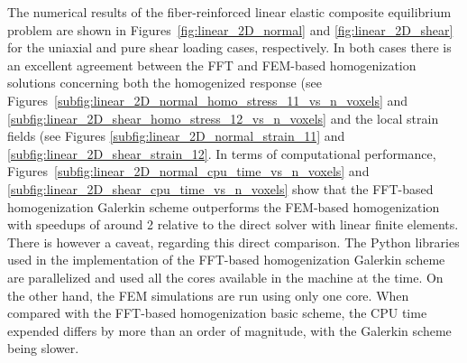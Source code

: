The numerical results of the fiber-reinforced linear elastic composite equilibrium problem are shown in Figures~\ref{fig:linear_2D_normal} and \ref{fig:linear_2D_shear} for the uniaxial and pure shear loading cases, respectively.
In both cases there is an excellent agreement between the FFT and FEM-based homogenization solutions concerning both the homogenized response (see Figures~\ref{subfig:linear_2D_normal_homo_stress_11_vs_n_voxels} and \ref{subfig:linear_2D_shear_homo_stress_12_vs_n_voxels} and the local strain fields (see Figures \ref{subfig:linear_2D_normal_strain_11} and \ref{subfig:linear_2D_shear_strain_12}.
In terms of computational performance, Figures~\ref{subfig:linear_2D_normal_cpu_time_vs_n_voxels} and \ref{subfig:linear_2D_shear_cpu_time_vs_n_voxels} show that the FFT-based homogenization Galerkin scheme outperforms the FEM-based homogenization with speedups of around 2 relative to the direct solver with linear finite elements.
There is however a caveat, regarding this direct comparison.
The Python libraries used in the implementation of the FFT-based homogenization Galerkin scheme are parallelized and used all the cores available in the machine at the time.
On the other hand, the FEM simulations are run using only one core.
When compared with the FFT-based homogenization basic scheme, the CPU time expended differs by more than an order of magnitude, with the Galerkin scheme being slower.

